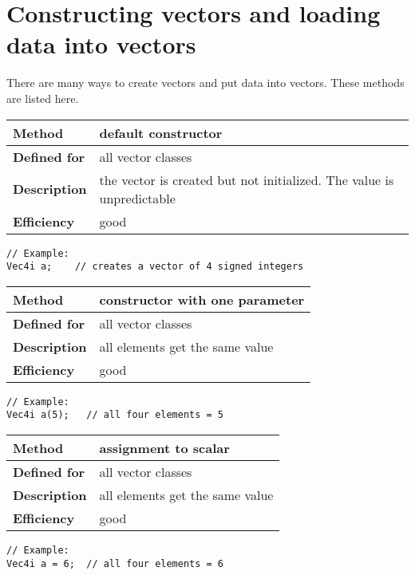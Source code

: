 \documentclass[vcl_manual.tex]{subfiles}
\begin{document}
\section{Constructing vectors and loading data into vectors} \label{ConstructingVectors}

There are many ways to create vectors and put data into vectors. These methods are listed here.

\begin{tabular}{|p{25mm}|p{100mm}|}
\hline
\bfseries Method & default constructor \\ \hline
\bfseries Defined for & all vector classes \\ \hline
\bfseries Description & the vector is created but not initialized. The value is unpredictable \\ \hline
\bfseries Efficiency & good \\ \hline
\end{tabular}

\begin{lstlisting}[frame=none]
// Example:
Vec4i a;    // creates a vector of 4 signed integers
\end{lstlisting}

\begin{tabular}[l]{|p{25mm}|p{100mm}|}
\hline
\bfseries Method & constructor with one parameter \\ \hline
\bfseries Defined for & all vector classes \\ \hline
\bfseries Description & all elements get the same value \\ \hline
\bfseries Efficiency & good \\ \hline
\end{tabular}
\begin{lstlisting}[frame=none]
// Example:
Vec4i a(5);   // all four elements = 5
\end{lstlisting}

\begin{tabular}{|p{25mm}|p{100mm}|}
\hline
\bfseries Method & assignment to scalar \\ \hline
\bfseries Defined for & all vector classes \\ \hline
\bfseries Description & all elements get the same value \\ \hline
\bfseries Efficiency & good \\ \hline
\end{tabular}
\begin{lstlisting}[frame=none]
// Example:
Vec4i a = 6;  // all four elements = 6
\end{lstlisting}
\end{document}
